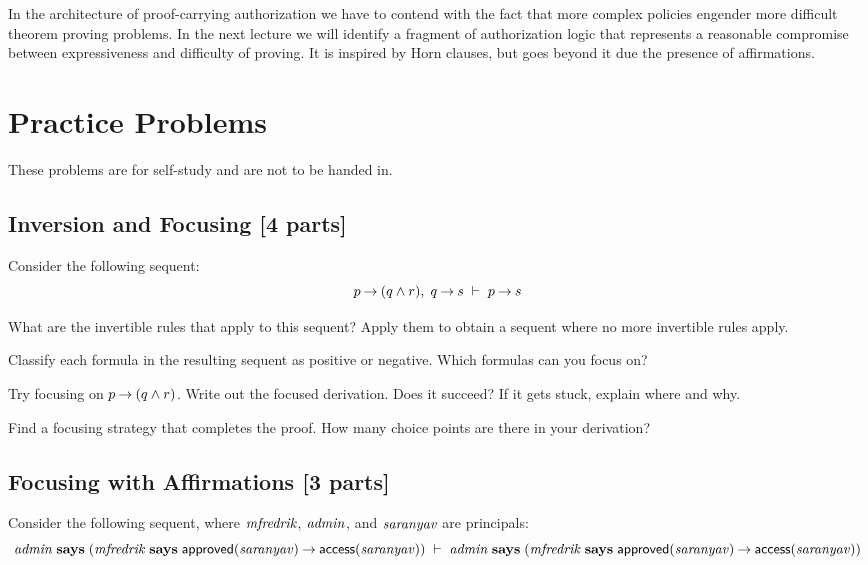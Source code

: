\documentclass[11pt]{article}
\begin{document}
In the architecture of proof-carrying authorization we have to contend with the
fact that more complex policies engender more difficult theorem proving
problems.  In the next lecture we will identify a fragment of authorization
logic that represents a reasonable compromise between expressiveness and
difficulty of proving.  It is inspired by Horn clauses, but goes beyond it due
the presence of affirmations.

\section{Practice Problems}

These problems are for self-study and are not to be handed in.

\subsection{Inversion and Focusing [4 parts]}

Consider the following sequent:
\[
  p \mathbin{\rightarrow} (q \land r),\; q \mathbin{\rightarrow} s \;\vdash\; p \mathbin{\rightarrow} s
\]

\begin{task}\rm
  \label{task:inv1}
  What are the invertible rules that apply to this sequent?  Apply them to
  obtain a sequent where no more invertible rules apply.
\end{task}

\begin{task}\rm
  \label{task:inv2}
  Classify each formula in the resulting sequent as positive or negative.
  Which formulas can you focus on?
\end{task}

\begin{task}\rm
  \label{task:inv3}
  Try focusing on $p \mathbin{\rightarrow} (q \land r)$.  Write out the focused derivation.
  Does it succeed?  If it gets stuck, explain where and why.
\end{task}

\begin{task}\rm
  \label{task:inv4}
  Find a focusing strategy that completes the proof.  How many choice points
  are there in your derivation?
\end{task}

\subsection{Focusing with Affirmations [3 parts]}

Consider the following sequent, where $\mathit{mfredrik}$, $\mathit{admin}$, and
$\mathit{saranyav}$ are principals:
\[
  \mathit{admin} \mathrel{\mathbf{says}} (\mathit{mfredrik} \mathrel{\mathbf{says}} \mathsf{approved}(\mathit{saranyav}) \mathbin{\rightarrow} \mathsf{access}(\mathit{saranyav}))
  \;\vdash\;
  \mathit{admin} \mathrel{\mathbf{says}} (\mathit{mfredrik} \mathrel{\mathbf{says}} \mathsf{approved}(\mathit{saranyav}) \mathbin{\rightarrow} \mathsf{access}(\mathit{saranyav}))
\]
\end{document}
